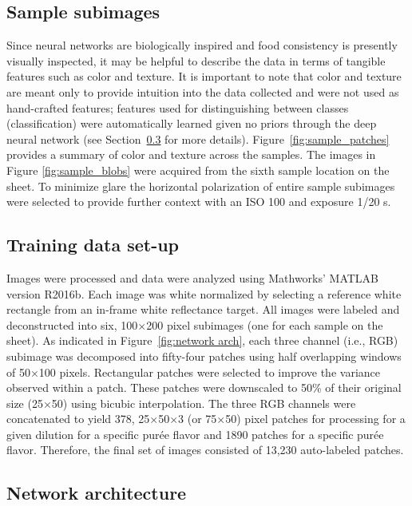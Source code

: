 \documentclass[authoryear]{elsarticle}
\begin{document}
\subsection{Sample subimages}\label{ssec:Sample subimages}
Since neural networks are biologically inspired and food consistency is presently visually inspected, it may be helpful to describe the data in terms of tangible features such as color and texture. It is important to note that color and texture are meant only to provide intuition into the data collected and were not used as hand-crafted features; features used for distinguishing between classes (classification) were automatically learned given no priors through the deep neural network (see Section~\ref{ssec:Network arch} for more details). Figure~\ref{fig:sample_patches} provides a summary of color and texture across the samples. The images in Figure \ref{fig:sample_blobs} were acquired from the sixth sample location on the sheet. To minimize glare the horizontal polarization of entire sample subimages were selected to provide further context with an ISO 100 and exposure 1/20 s. 

\subsection{Training data set-up}\label{ssec:Training data}
Images were processed and data were analyzed using Mathworks’ MATLAB version R2016b. Each image was white normalized by selecting a reference white rectangle from an in-frame white reflectance target. All images were labeled and deconstructed into six, 100$\times$200 pixel subimages (one for each sample on the sheet). As indicated in Figure~\ref{fig:network arch}, each three channel (i.e., RGB) subimage was decomposed into fifty-four patches using half overlapping windows of 50$\times$100 pixels. Rectangular patches were selected to improve the variance observed within a patch. These patches were downscaled to 50\% of their original size (25$\times$50) using bicubic interpolation. The three RGB channels were concatenated to yield 378, 25$\times$50$\times$3 (or 75$\times$50) pixel patches for processing for a given dilution for a specific pur\' ee flavor and 1890 patches for a specific pur\' ee flavor. Therefore, the final set of images consisted of 13,230 auto-labeled patches.

\subsection{Network architecture}\label{ssec:Network arch}
 
\end{document}
